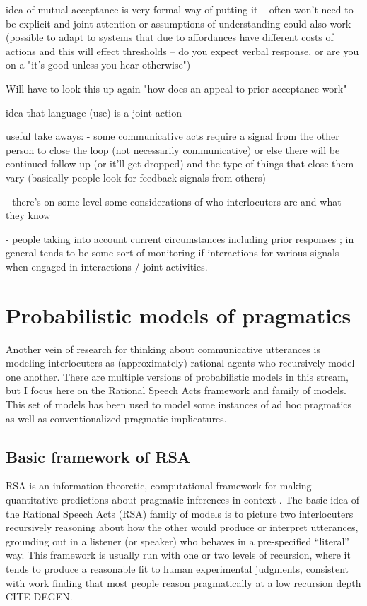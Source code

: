 \documentclass[]{article}
\begin{document}
\cite{clark1986} idea of mutual acceptance is very formal way of putting it -- often won't need to be explicit and joint attention or assumptions of understanding could also work (possible to adapt to systems that due to affordances have different costs of actions and this will effect thresholds -- do you expect verbal response, or are you on a "it's good unless you hear otherwise") 

\cite{clark1986} Will have to look this up again "how does an appeal to prior acceptance work"



\cite{clark1996} idea that language (use) is a joint action

\cite{clark1996} useful take aways: - some communicative acts require a signal from the other person to close the loop (not necessarily communicative) or else there will be continued follow up (or it’ll get dropped) and the type of things that close them vary (basically people look for feedback signals from others)

- there’s on some level some considerations of who interlocuters are and what they know

- people taking into account current circumstances including prior responses ; in general tends to be some sort of monitoring if interactions for various signals when engaged in interactions / joint activities.


\section{Probabilistic models of pragmatics}

Another vein of research for thinking about communicative utterances is modeling interlocuters as (approximately) rational agents who recursively model one another. There are multiple versions of probabilistic models in this stream, but I focus here on the Rational Speech Acts framework and family of models. This set of models has been used to model some instances of ad hoc pragmatics as well as conventionalized pragmatic implicatures. 

\subsection{Basic framework of RSA}

RSA is an information-theoretic, computational framework for making quantitative predictions about pragmatic inferences in context \cite{goodman2016, frank2012a}. The basic idea of the Rational Speech Acts (RSA) family of models is to picture two interlocuters recursively reasoning about how the other would produce or interpret utterances, grounding out in a listener (or speaker) who behaves in a pre-specified ``literal'' way. This framework is usually run with one or two levels of recursion, where it tends to produce a reasonable fit to human experimental judgments, consistent with work finding that most people reason pragmatically at a low recursion depth CITE DEGEN. 
\end{document}

